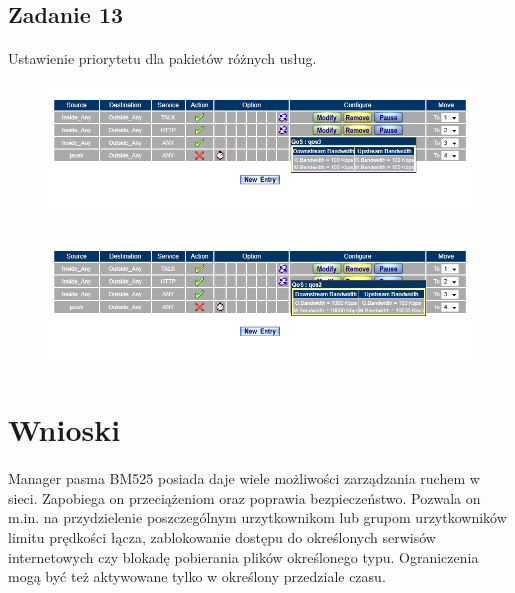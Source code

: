 \documentclass[wide,a4paper,titlepage,12pt] {article}
\begin{document}
  \subsection{Zadanie 13}
  \paragraph{}
  Ustawienie priorytetu dla pakietów różnych usług.
  \begin{figure}[h!]
    \begin{center}
      \includegraphics[width=\textwidth]{15.PNG}
    \end{center}
  \end{figure}

  \begin{figure}[h!]
    \begin{center}
      \includegraphics[width=\textwidth]{16.PNG}
    \end{center}
  \end{figure}



  \section{Wnioski}
  \paragraph{}
  Manager pasma BM525 posiada daje wiele możliwości zarządzania ruchem w sieci. Zapobiega on przeciążeniom oraz poprawia bezpieczeństwo. Pozwala on m.in. na przydzielenie poszczególnym urzytkownikom lub grupom urzytkowników limitu prędkości łącza, zablokowanie dostępu do określonych serwisów internetowych czy blokadę pobierania plików określonego typu. Ograniczenia mogą być też aktywowane tylko w określony przedziale czasu.
\end{document}
